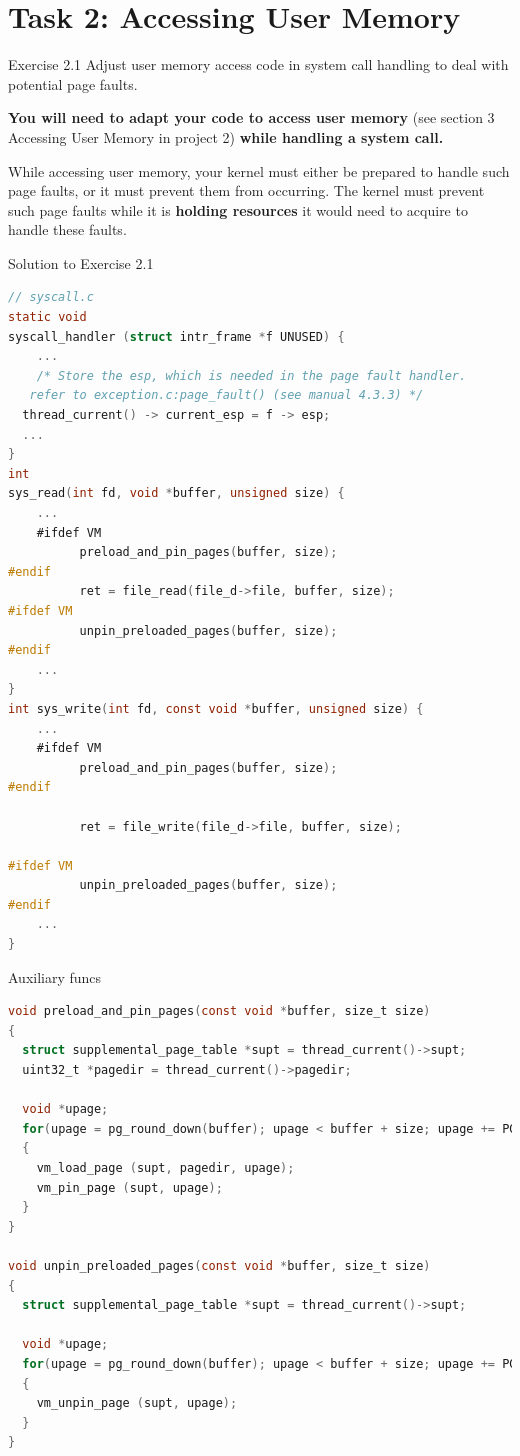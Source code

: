 \documentclass[10pt]{beamer}
\begin{document}
\section{Task 2: Accessing User Memory}
\begin{frame}[fragile]{Exercise 2.1}
    Adjust user memory access code in system call handling to deal with potential page faults.
    
    \textbf{You will need to adapt your code to access user memory} (see section 3 Accessing User Memory in project 2) \textbf{while handling a system call.}

    While accessing user memory, your kernel must either be prepared to handle such page faults, or it must prevent them from occurring.
The kernel must prevent such page faults while it is \textbf{holding resources} it would need to acquire to handle these faults.
\end{frame}
\begin{frame}[fragile]{Solution to Exercise 2.1}
\begin{lstlisting}[language=C]
// syscall.c
static void
syscall_handler (struct intr_frame *f UNUSED) {
    ...
    /* Store the esp, which is needed in the page fault handler.
   refer to exception.c:page_fault() (see manual 4.3.3) */
  thread_current() -> current_esp = f -> esp;
  ...
}
int 
sys_read(int fd, void *buffer, unsigned size) {
    ...
    #ifdef VM
          preload_and_pin_pages(buffer, size);
#endif
          ret = file_read(file_d->file, buffer, size);
#ifdef VM
          unpin_preloaded_pages(buffer, size);
#endif
    ...
}
int sys_write(int fd, const void *buffer, unsigned size) {
    ...
    #ifdef VM
          preload_and_pin_pages(buffer, size);
#endif
    
          ret = file_write(file_d->file, buffer, size);
    
#ifdef VM
          unpin_preloaded_pages(buffer, size);
#endif        
    ...
}
\end{lstlisting}
\end{frame}
\begin{frame}[fragile]{Auxiliary funcs}
\begin{lstlisting}[language=C]
void preload_and_pin_pages(const void *buffer, size_t size)
{
  struct supplemental_page_table *supt = thread_current()->supt;
  uint32_t *pagedir = thread_current()->pagedir;

  void *upage;
  for(upage = pg_round_down(buffer); upage < buffer + size; upage += PGSIZE)
  {
    vm_load_page (supt, pagedir, upage);
    vm_pin_page (supt, upage);
  }
}

void unpin_preloaded_pages(const void *buffer, size_t size)
{
  struct supplemental_page_table *supt = thread_current()->supt;

  void *upage;
  for(upage = pg_round_down(buffer); upage < buffer + size; upage += PGSIZE)
  {
    vm_unpin_page (supt, upage);
  }
}
\end{lstlisting}
\end{frame}
\end{document}
